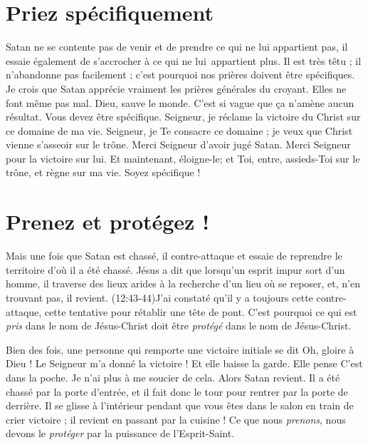 \section{Priez sp\'ecifiquement}

Satan ne se contente pas de venir et de prendre ce qui ne lui appartient pas,
 il essaie également de s'accrocher à ce qui ne lui~appartient %
 plus.  Il est très têtu ; il n'abandonne pas facilement ;
 c'est pourquoi nos prières doivent être spécifiques.
 Je crois que Satan apprécie vraiment les prières générales du croyant.
 Elles ne font même pas mal. \Og Dieu, sauve le monde. \Fg{}
 C'est si vague que ça n'amène aucun résultat.
 Vous devez être spécifique. \Og Seigneur, je réclame la victoire du Christ
 sur ce domaine de ma vie. Seigneur, je Te consacre ce domaine ;
 je veux que Christ vienne s'asseoir sur le trône.
 Merci Seigneur d'avoir jugé Satan.
 Merci Seigneur pour la victoire sur lui.
 Et maintenant, éloigne-le;
 et Toi, entre, assieds-Toi sur le trône,
 et règne sur ma vie. \Fg{} Soyez spécifique !


\section{Prenez et prot\'egez !}

Mais une fois que Satan est chassé, il contre-attaque et essaie de reprendre
 le territoire d'où il a été chassé.
 Jésus a dit que lorsqu'un esprit impur sort d'un homme,
 il traverse des lieux arides à la recherche d'un lieu où se reposer,
 et, n'en trouvant pas, il revient.
 (12:43-44)J'ai constaté qu'il y a toujours cette contre-attaque,
 cette tentative pour rétablir une tête de pont.
 C'est pourquoi ce qui est \emph{pris}
 dans le nom de Jésus-Christ doit être
 \emph{protégé} dans le nom de Jésus-Christ.

Bien des fois, une personne qui remporte une victoire initiale se dit\frcolon{}
 \Og Oh, gloire à Dieu ! Le Seigneur m'a donné la victoire ! \Fg{}
 Et elle baisse la garde. Elle pense\frcolon{} \Og C'est dans la poche.
 Je n'ai plus à me soucier de cela. \Fg{} Alors Satan revient.
 Il a été chassé par la porte d'entrée, et il fait donc le tour
 pour rentrer par la porte de derrière.
 Il se glisse à l'intérieur pendant que vous êtes dans le salon
 en train de crier victoire ; il revient en passant par la cuisine !
 Ce que nous \emph{prenons}, nous devons le \emph{protéger}
 par la puissance de l'Esprit-Saint.
\closechapter


